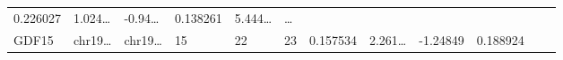 \documentclass[
]{article}
\begin{document}
\begin{longtable}[]{@{}llllllllllll@{}}
\begin{minipage}[t]{0.06\columnwidth}
0.226027\strut
\end{minipage} & \begin{minipage}[t]{0.08\columnwidth}\raggedright
1.024\ldots{}\strut
\end{minipage} & \begin{minipage}[t]{0.06\columnwidth}\raggedright
-0.94\ldots{}\strut
\end{minipage} & \begin{minipage}[t]{0.06\columnwidth}\raggedright
0.138261\strut
\end{minipage} & \begin{minipage}[t]{0.09\columnwidth}\raggedright
5.444\ldots{}\strut
\end{minipage} & \begin{minipage}[t]{0.02\columnwidth}\raggedright
\ldots{}\strut
\end{minipage}\tabularnewline
\begin{minipage}[t]{0.06\columnwidth}\raggedright
GDF15\strut
\end{minipage} & \begin{minipage}[t]{0.06\columnwidth}\raggedright
chr19\ldots{}\strut
\end{minipage} & \begin{minipage}[t]{0.06\columnwidth}\raggedright
chr19\ldots{}\strut
\end{minipage} & \begin{minipage}[t]{0.06\columnwidth}\raggedright
15\strut
\end{minipage} & \begin{minipage}[t]{0.06\columnwidth}\raggedright
22\strut
\end{minipage} & \begin{minipage}[t]{0.06\columnwidth}\raggedright
23\strut
\end{minipage} & \begin{minipage}[t]{0.06\columnwidth}\raggedright
0.157534\strut
\end{minipage} & \begin{minipage}[t]{0.08\columnwidth}\raggedright
2.261\ldots{}\strut
\end{minipage} & \begin{minipage}[t]{0.06\columnwidth}\raggedright
-1.24849\strut
\end{minipage} & \begin{minipage}[t]{0.06\columnwidth}\raggedright
0.188924\strut
\end{minipage} & \begin{minipage}[t]{0.09\columnwidth}\raggedright

\end{minipage}
\end{longtable}
\end{document}
